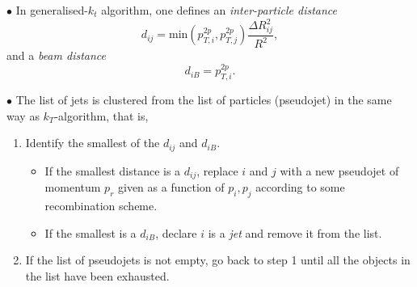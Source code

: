 \documentclass[9pt,a4paper,unknownkeysallowed,xcolor=dvipsnames,aspectratio=43]{beamer}
\begin{document}
%
%
\begin{frame}

{\color{darkred}\Large$\bullet$} In {\color{darkred}generalised-$k_t$ algorithm}, one defines 
an {\em inter-particle distance}
  \begin{equation}
    d_{ij} = \text{min}(p_{T,i}^{2p},p_{T,j}^{2p}) \frac{\Delta R_{ij}^2}{R^2},
  \end{equation}
and
a {\em beam distance}
  \begin{equation}
    d_{iB} = p_{T,i}^{2p}.
  \end{equation}
 \vspace{2mm}
  
  
{\color{darkred}\Large$\bullet$} The list of jets is clustered from the list of particles (pseudojet) in the same way as $k_T$-algorithm, that is,
\vspace{2mm}
\begin{enumerate}
\item Identify the smallest of the $d_{ij}$ and $d_{iB}$.
  \vspace{2mm}
  \begin{itemize}
  \item[\diamondsuit] If the smallest distance is a $d_{ij}$, replace $i$ and
    $j$ with a new pseudojet of momentum $p_r$ given as a function of $p_i, p_j$ according to some recombination scheme.
    \vspace{2mm}
    
  \item[\diamondsuit] If the smallest is a $d_{iB}$, declare $i$ is a {\em jet} and remove it from the list.
  \end{itemize}
  \item If the list of pseudojets is not empty, go back to step 1 until all the objects in the list have
  been exhausted.
\end{enumerate}
\end{frame}
%
%
\end{document}
